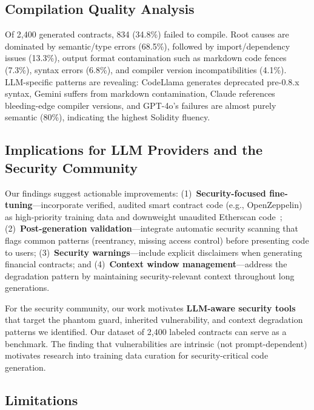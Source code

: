 \subsection{Compilation Quality Analysis}

Of 2,400 generated contracts, 834 (34.8\%) failed to compile. Root causes are dominated by semantic/type errors (68.5\%), followed by import/dependency issues (13.3\%), output format contamination such as markdown code fences (7.3\%), syntax errors (6.8\%), and compiler version incompatibilities (4.1\%). LLM-specific patterns are revealing: CodeLlama generates deprecated pre-0.8.x syntax, Gemini suffers from markdown contamination, Claude references bleeding-edge compiler versions, and GPT-4o's failures are almost purely semantic (80\%), indicating the highest Solidity fluency.

\subsection{Implications for LLM Providers and the Security Community}

Our findings suggest actionable improvements: (1)~\textbf{Security-focused fine-tuning}---incorporate verified, audited smart contract code (e.g., OpenZeppelin) as high-priority training data and downweight unaudited Etherscan code~\cite{bai2022training}; (2)~\textbf{Post-generation validation}---integrate automatic security scanning that flags common patterns (reentrancy, missing access control) before presenting code to users; (3)~\textbf{Security warnings}---include explicit disclaimers when generating financial contracts; and (4)~\textbf{Context window management}---address the degradation pattern by maintaining security-relevant context throughout long generations.

For the security community, our work motivates \textbf{LLM-aware security tools} that target the phantom guard, inherited vulnerability, and context degradation patterns we identified. Our dataset of 2,400 labeled contracts can serve as a benchmark. The finding that vulnerabilities are intrinsic (not prompt-dependent) motivates research into training data curation for security-critical code generation.

\subsection{Limitations}

